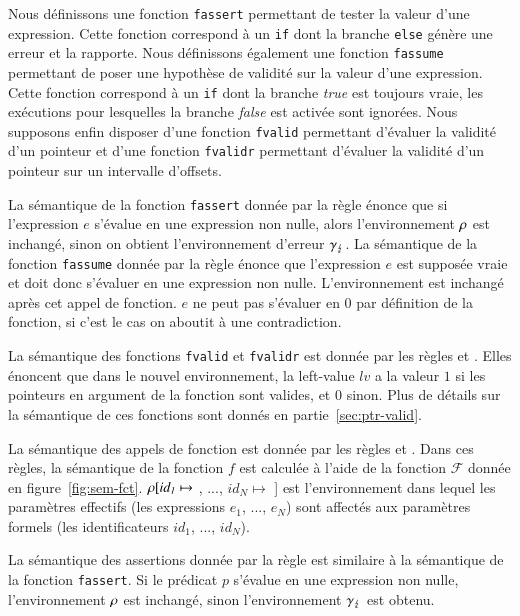 Nous définissons une fonction \lstinline'fassert' permettant de tester la valeur
d'une expression.
Cette fonction correspond à un \lstinline'if' dont la branche
\lstinline'else' génère une erreur et la rapporte.
Nous définissons également une fonction \lstinline'fassume' permettant de poser
une hypothèse de validité sur la valeur d'une expression.
Cette fonction correspond à un \lstinline'if' dont
la branche \textit{true} est toujours vraie, les exécutions pour lesquelles
la branche \textit{false} est activée sont ignorées.
Nous supposons enfin disposer d'une fonction \lstinline'fvalid' permettant
d'évaluer la validité d'un pointeur et d'une fonction \lstinline'fvalidr'
permettant d'évaluer la validité d'un pointeur sur un intervalle d'offsets.

La sémantique de la fonction \lstinline'fassert' donnée par la règle
 énonce que si l'expression $e$ s'évalue en une
expression non nulle, alors l'environnement $\rho$ est inchangé, sinon on obtient
l'environnement d'erreur $\gamma_\lightning$.
La sémantique de la fonction \lstinline'fassume' donnée par la règle
 énonce que l'expression $e$ est supposée vraie et
doit donc s'évaluer en une expression non nulle.
L'environnement est inchangé après cet appel de fonction.
$e$ ne peut pas s'évaluer en $0$ par définition de la fonction, si c'est
le cas on aboutit à une contradiction.

La sémantique des fonctions \lstinline'fvalid' et \lstinline'fvalidr' est donnée
par les règles  et .
Elles énoncent que dans le nouvel environnement, la left-value $\mathit{lv}$ a
la valeur $1$ si les pointeurs en argument de la fonction sont valides, et $0$
sinon.
Plus de détails sur la sémantique de ces fonctions sont donnés en
partie~\ref{sec:ptr-valid}.

La sémantique des appels de fonction est donnée par les règles 
et .
Dans ces règles, la sémantique de la fonction $f$ est calculée à
l'aide de la fonction $\mathcal{F}$ donnée en figure~\ref{fig:sem-fct}.
$\rho[\mathit{id_1} \mapsto$ , ...,
  $\mathit{id_N} \mapsto$ ] est l'environnement
dans lequel les paramètres effectifs (les expressions $e_1$, ..., $e_N$) sont
affectés aux paramètres formels (les identificateurs
$\mathit{id_1}$, ..., $\mathit{id_N}$).

La sémantique des assertions \eacsl donnée par la règle  est
similaire à la sémantique de la fonction \lstinline'fassert'.
Si le prédicat $p$ s'évalue en une expression non nulle,
l'environnement $\rho$ est inchangé, sinon l'environnement $\gamma_\lightning$ est
obtenu.

